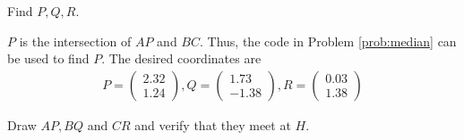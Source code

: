 \documentclass[journal,12pt,twocolumn]{IEEEtran}
\begin{document}
%
\begin{problem}
Find $P,Q,R$.
\end{problem}
\solution $P$ is the intersection of $AP$ and $BC$.  Thus, the code in Problem \ref{prob:median} can be used to find 
$P$.  The desired coordinates are
%
\begin{align}
P =
\begin{pmatrix}
 2.32
 \\
  1.24
\end{pmatrix}
,
Q=
\begin{pmatrix}
 1.73
 \\
 -1.38
\end{pmatrix},
R=
\begin{pmatrix}
 0.03
 \\
  1.38
\end{pmatrix}
\end{align}
%
\begin{problem}
Draw $AP, BQ$ and $CR$ and verify that they meet at $H$.  
\end{problem}
\end{document}
